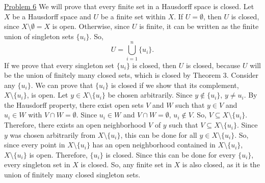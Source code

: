 \documentclass{exam}
\begin{document}
\underline{Problem 6}
\newline
\newline
We will prove that every finite set in a Hausdorff space is closed. Let $X$ be a Hausdorff space and $U$ be a finite set within $X$. If $U=\emptyset$, then $U$ is closed, since $X\setminus\emptyset=X$ is open. Otherwise, since $U$ is finite, it can be written as the finite union of singleton sets $\{u_i\}$. So,
\[
U=\bigcup_{i=1}^{n}\{u_i\}.
\]
If we prove that every singleton set $\{u_i\}$ is closed, then $U$ is closed, because $U$ will be the union of finitely many closed sets, which is closed by Theorem 3. Consider any $\{u_i\}$.
\newline
\newline
We can prove that $\{u_i\}$ is closed if we show that its complement, $X\setminus\{u_i\}$, is open. Let $y\in X\setminus\{u_i\}$ be chosen arbitrarily. Since $y\notin\{u_i\}$, $y\neq u_i$. By the Hausdorff property, there exist open sets $V$ and $W$ such that $y\in V$ and $u_i\in W$ with $V\cap W=\emptyset$. Since $u_i\in W$ and $V\cap W=\emptyset$, $u_i\notin V$. So, $V\subseteq X\setminus\{u_i\}$. Therefore, there exists an open neighborhood $V$ of $y$ such that $V\subseteq X\setminus\{u_i\}$. Since $y$ was chosen arbitrarily from $X\setminus\{u_i\}$, this can be done for all $y\in X\setminus\{u_i\}$. So, since every point in $X\setminus\{u_i\}$ has an open neighborhood contained in $X\setminus\{u_i\}$, $X\setminus\{u_i\}$ is open.
\newline
\newline
Therefore, $\{u_i\}$ is closed. Since this can be done for every $\{u_i\}$, every singleton set in $X$ is closed. So, any finite set in $X$ is also closed, as it is the union of finitely many closed singleton sets.
\newline
\end{document}
